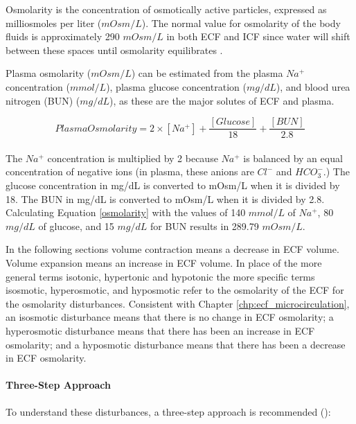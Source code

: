 Osmolarity is the concentration of osmotically active particles, expressed as milliosmoles per liter ($mOsm/L$). The normal value for osmolarity of the body fluids is approximately 290 $mOsm/L$ in both ECF and ICF since water will shift between these spaces until osmolarity equilibrates \cite{costanzo_physiology_2013}.

Plasma osmolarity ($mOsm/L$) can be estimated from the plasma $Na^+$ concentration ($mmol/L$), plasma glucose concentration ($mg/dL$), and blood urea nitrogen (BUN) ($mg/dL$), as these are the major solutes of ECF and plasma. 

\begin{equation}
Plasma Osmolarity = 2 \times [Na^+] + \frac{[Glucose]}{18} +\frac{[BUN]}{2.8}
\label{osmolarity}
\end{equation}
\paragraph{}
The $Na^+$ concentration is multiplied by 2 because $Na^+$ is balanced by an equal concentration of negative ions (in plasma, these anions are $Cl^-$ and $HCO_3^-$.)\footnotemark{} The glucose concentration in mg/dL is converted to mOsm/L when it is divided by 18. The BUN in mg/dL is converted to mOsm/L when it is divided by 2.8. Calculating Equation \ref{osmolarity} with the values of 140 $mmol/L$ of $Na^+$, 80 $mg/dL$ of glucose, and 15 $mg/dL$ for BUN results in 289.79 $mOsm/L$.

In the following sections volume contraction means a decrease in ECF volume. Volume expansion means an increase in ECF volume. In place of the more general terms isotonic, hypertonic and hypotonic the more specific terms isosmotic, hyperosmotic, and hyposmotic refer to the osmolarity of the ECF for the osmolarity disturbances. Consistent with Chapter \ref{chp:ecf_microcirculation}, an isosmotic disturbance means that there is no change in ECF osmolarity; a hyperosmotic disturbance means that there has been an increase in ECF osmolarity; and a hyposmotic disturbance means that there has been a decrease in ECF osmolarity.

\paragraph{Three-Step Approach}
To understand these disturbances, a three-step approach is recommended (\cite{costanzo_physiology_2013}):

